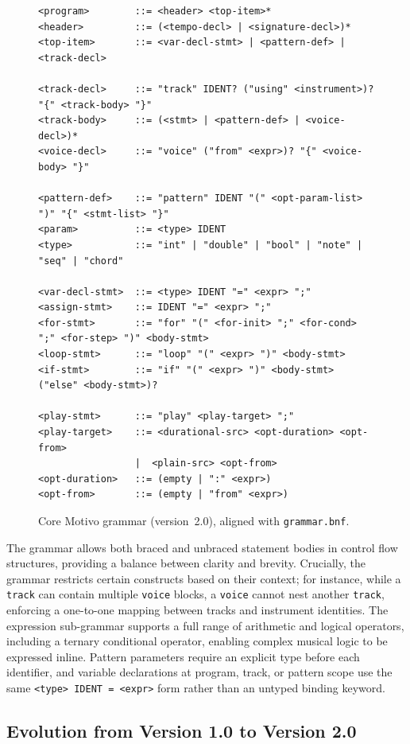 \begin{figure}[htbp]
  \centering
  \begin{lstlisting}[basicstyle=\ttfamily\scriptsize,breaklines=true]
<program>        ::= <header> <top-item>*
<header>         ::= (<tempo-decl> | <signature-decl>)*
<top-item>       ::= <var-decl-stmt> | <pattern-def> | <track-decl>

<track-decl>     ::= "track" IDENT? ("using" <instrument>)? "{" <track-body> "}"
<track-body>     ::= (<stmt> | <pattern-def> | <voice-decl>)*
<voice-decl>     ::= "voice" ("from" <expr>)? "{" <voice-body> "}"

<pattern-def>    ::= "pattern" IDENT "(" <opt-param-list> ")" "{" <stmt-list> "}"
<param>          ::= <type> IDENT
<type>           ::= "int" | "double" | "bool" | "note" | "seq" | "chord"

<var-decl-stmt>  ::= <type> IDENT "=" <expr> ";"
<assign-stmt>    ::= IDENT "=" <expr> ";"
<for-stmt>       ::= "for" "(" <for-init> ";" <for-cond> ";" <for-step> ")" <body-stmt>
<loop-stmt>      ::= "loop" "(" <expr> ")" <body-stmt>
<if-stmt>        ::= "if" "(" <expr> ")" <body-stmt> ("else" <body-stmt>)?

<play-stmt>      ::= "play" <play-target> ";"
<play-target>    ::= <durational-src> <opt-duration> <opt-from>
                 |  <plain-src> <opt-from>
<opt-duration>   ::= (empty | ":" <expr>)
<opt-from>       ::= (empty | "from" <expr>)
  \end{lstlisting}
  \caption{Core Motivo grammar (version~2.0), aligned with \texttt{grammar.bnf}.}\label{fig:grammar-ebnf}
\end{figure}

The grammar allows both braced and unbraced statement bodies in control flow structures, providing a balance between
clarity and brevity.
Crucially, the grammar restricts certain constructs based on their context; for instance, while a \texttt{track} can
contain multiple \texttt{voice} blocks, a \texttt{voice} cannot nest another \texttt{track}, enforcing a one-to-one
mapping between tracks and instrument identities.
The expression sub-grammar supports a full range of arithmetic and logical operators, including a ternary conditional
operator, enabling complex musical logic to be expressed inline.
Pattern parameters require an explicit type before each identifier, and variable declarations at program, track, or
pattern scope use the same \texttt{<type> IDENT = <expr>} form rather than an untyped binding keyword.

\subsection{Evolution from Version 1.0 to Version 2.0}\label{detail-subsec:v1-v2-grammar-evolution}

